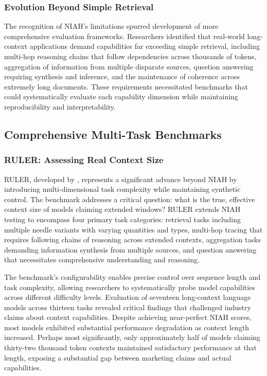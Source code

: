 \documentclass[11pt,letterpaper]{article}
\begin{document}
\subsubsection{Evolution Beyond Simple Retrieval}

The recognition of NIAH's limitations spurred development of more comprehensive evaluation frameworks. Researchers identified that real-world long-context applications demand capabilities far exceeding simple retrieval, including multi-hop reasoning chains that follow dependencies across thousands of tokens, aggregation of information from multiple disparate sources, question answering requiring synthesis and inference, and the maintenance of coherence across extremely long documents. These requirements necessitated benchmarks that could systematically evaluate each capability dimension while maintaining reproducibility and interpretability.

\subsection{Comprehensive Multi-Task Benchmarks}

\subsubsection{RULER: Assessing Real Context Size}

RULER, developed by \cite{hsieh2024ruler}, represents a significant advance beyond NIAH by introducing multi-dimensional task complexity while maintaining synthetic control. The benchmark addresses a critical question: what is the true, effective context size of models claiming extended windows? RULER extends NIAH testing to encompass four primary task categories: retrieval tasks including multiple needle variants with varying quantities and types, multi-hop tracing that requires following chains of reasoning across extended contexts, aggregation tasks demanding information synthesis from multiple sources, and question answering that necessitates comprehensive understanding and reasoning.

The benchmark's configurability enables precise control over sequence length and task complexity, allowing researchers to systematically probe model capabilities across different difficulty levels. Evaluation of seventeen long-context language models across thirteen tasks revealed critical findings that challenged industry claims about context capabilities. Despite achieving near-perfect NIAH scores, most models exhibited substantial performance degradation as context length increased. Perhaps most significantly, only approximately half of models claiming thirty-two thousand token contexts maintained satisfactory performance at that length, exposing a substantial gap between marketing claims and actual capabilities.
\end{document}
